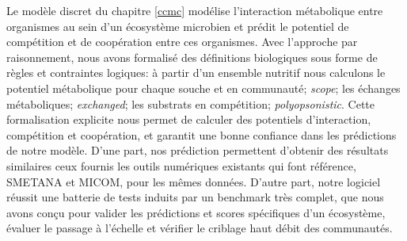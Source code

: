 \documentclass[../main.tex]{subfiles}
\begin{document}


Le modèle discret du chapitre \ref{ccmc} modélise l'interaction métabolique entre organismes au sein d'un écosystème microbien et prédit le potentiel de compétition et de coopération entre ces organismes. Avec l'approche par raisonnement, nous avons formalisé des définitions biologiques sous forme de règles et contraintes logiques: à partir d'un ensemble nutritif nous calculons le potentiel métabolique pour chaque souche et en communauté; \textit{scope}; les échanges métaboliques; \textit{exchanged}; les substrats en compétition; \textit{polyopsonistic}. Cette formalisation explicite nous permet de calculer des potentiels d'interaction, compétition et coopération, et garantit une bonne confiance dans les prédictions de notre modèle.
D'une part, nos prédiction permettent d'obtenir des résultats similaires ceux fournis les outils numériques existants qui font référence, SMETANA et MICOM, pour les mêmes données.
D'autre part, notre logiciel réussit une batterie de tests induits par un benchmark très complet, que nous avons conçu pour valider les prédictions et scores spécifiques d'un écosystème, évaluer le passage à l'échelle et vérifier le criblage haut débit des communautés.
\end{document}
